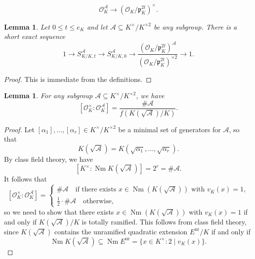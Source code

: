 \documentclass[11pt]{amsart}
\theoremstyle{theorem}
\newtheorem{lemma}[theorem]{Lemma}
\theoremstyle{example}
\theoremstyle{definition}
\numberwithin{theorem}{section}
\numberwithin{theorem}{section}
\DeclareMathOperator{\Nm}{Nm}
\newcommand{\co}{\mathcal{O}}
\newcommand{\p}{\mathfrak{p}}
\begin{document}
$$
\co_K^\mathcal{A} \to (\co_K/\p_K^{2t})^\times.
$$
\begin{lemma}
    \label{lem-SKKtA-in-terms-of-SKK0A}
    Let $0 \leq t \leq e_K$ and let $\mathcal{A}\subseteq K^\times / K^{\times 2}$ be any subgroup. There is a short exact sequence 
    $$
    1 \to S_{K/K, t}^\mathcal{A} \to S_{K/K,0}^\mathcal{A} \to \frac{(\co_K/\p_K^{2t})^\mathcal{A}}{(\co_K/\p_K^{2t})^{\times 2}} \to 1.  
    $$
\end{lemma}
\begin{proof}
    This is immediate from the definitions.
\end{proof}
\begin{lemma}
    \label{lem-index-of-OKA}
    For any subgroup $\mathcal{A}\subseteq K^\times / K^{\times 2}$, we have 
    $$
    [\co_K^\times : \co_K^\mathcal{A}] = \frac{\#\mathcal{A}}{f(K(\sqrt{\mathcal{A}})/K)}.
    $$
\end{lemma}
\begin{proof}
    Let $[\alpha_1],\ldots, [\alpha_r]\in K^\times / K^{\times 2}$ be a minimal set of generators for $\mathcal{A}$, so that 
    $$
    K(\sqrt{\mathcal{A}}) = K(\sqrt{\alpha_1},\ldots, \sqrt{\alpha_r}). 
    $$
    By class field theory, we have 
    $$
    [K^\times : \Nm K(\sqrt{\mathcal{A}})] = 2^r = \#\mathcal{A}. 
    $$
    It follows that 
    $$
    [\co_K^\times : \co_K^\mathcal{A}] = \begin{cases}
    \#\mathcal{A}\quad\text{if there exists $x \in \Nm(K(\sqrt{\mathcal{A}}))$ with $v_K(x) = 1$},
    \\
    \frac{1}{2}\cdot\#\mathcal{A} \quad\text{otherwise},
    \end{cases}
    $$
    so we need to show that there exists $x \in \Nm(K(\sqrt{\mathcal{A}}))$ with $v_K(x) = 1$ if and only if $K(\sqrt{\mathcal{A}})/K$ is totally ramified. This follows from class field theory, since $K(\sqrt{\mathcal{A}})$ contains the unramified quadratic extension $E^{\mathrm{ur}}/K$ if and only if 
    $$
    \Nm K(\sqrt{\mathcal{A}}) \subseteq \Nm E^{\mathrm{ur}} = \{x \in K^\times : 2 \mid v_K(x)\}.
    $$
\end{proof}
\end{document}
